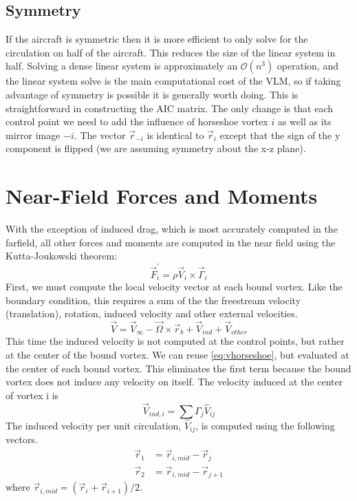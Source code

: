\documentclass{article}
\begin{document}
\subsection{Symmetry}

If the aircraft is symmetric then it is more efficient to only solve for the circulation on half of the aircraft.  This reduces the size of the linear system in half.  Solving a dense linear system is approximately an $\mathcal{O}(n^3)$ operation, and the linear system solve is the main computational cost of the VLM, so if taking advantage of symmetry is possible it is generally worth doing.  This is straightforward in constructing the AIC matrix.  The only change is that each control point we need to add the influence of horseshoe vortex $i$ as well as its mirror image $-i$.  The vector $\vec{r}_{-i}$ is identical to $\vec{r}_{i}$ except that the sign of the y component is flipped (we are assuming symmetry about the x-z plane).

\section{Near-Field Forces and Moments}

With the exception of induced drag, which is most accurately computed in the farfield, all other forces and moments are computed in the near field using the Kutta-Joukowski theorem:
\begin{equation}
\vec F^\prime_i = \rho \vec V_i \times \vec \Gamma_i
\end{equation}
First, we must compute the local velocity vector at each bound vortex.  Like the boundary condition, this requires a sum of the the freestream velocity (translation), rotation, induced velocity and other external velocities.  
\begin{equation}
\vec V = \vec{V}_\infty - \vec{\Omega} \times \vec{r}_b + \vec{V}_{ind} + \vec{V}_{other}
\end{equation}
This time the induced velocity is not computed at the control points, but rather at the center of the bound vortex.  We can reuse \cref{eq:vhorseshoe}, but evaluated at the center of each bound vortex.  This eliminates the first term because the bound vortex does not induce any velocity on itself.  The velocity induced at the center of vortex i is
\begin{equation}
\vec{V}_{ind, i} = \sum \Gamma_j \hat{V}_{ij}
\end{equation}
The induced velocity per unit circulation, $\hat{V}_{ij}$, is computed using the following vectors.
\begin{align}
\vec{r}_1 &= {\vec r}_{i,mid} - \vec{r}_{j}\\
\vec{r}_2 &= {\vec r}_{i,mid} - \vec{r}_{j+1}
\end{align}
where ${\vec r}_{i,mid} = (\vec{r}_i + \vec{r}_{i+1})/2$.  
\end{document}
